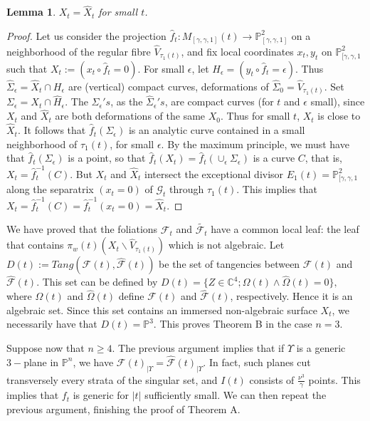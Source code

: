 \documentclass{amsart}
\newtheorem{lemma}[theorem]{Lemma}
\theoremstyle{definition}
\theoremstyle{proposition}
\numberwithin{equation}{section}
\theoremstyle{main}
\begin{document}
\begin{lemma}\label{lemafund}$X_t=\hat X_t$ for small $t$.
\end{lemma}
\begin{proof} Let us consider the projection $\hat{f}_{t}:M_{[\gamma,\gamma,1]}(t) \to  \mathbb P_{[\gamma,\gamma,1]}^2$ on a neighborhood of the regular fibre  $\hat V_{\tau_1(t)}$, and fix local coordinates $x_t,y_t$ on $\mathbb P_{[\gamma,\gamma,1}^2$ such that $X_t:=(x_t\circ\hat{f}_{t}=0)$. For small $\epsilon$, let $H_{\epsilon}=(y_t\circ\hat{f}_{t}=\epsilon)$. Thus $\hat\Sigma_\epsilon=\hat X_t\cap H_\epsilon$ are (vertical) compact curves, deformations of $\hat\Sigma_0=\hat V_{\tau_1(t)}$. Set $\Sigma_\epsilon=X_t\cap\hat H_\epsilon$. The $\Sigma_\epsilon's$, as the $\hat\Sigma_\epsilon's$, are compact curves (for $t$ and $\epsilon$ small), since $X_t$ and $\hat X_t$ are both deformations of the same $X_0$. Thus for small $t$, $X_t$ is close to $\hat X_t$. It follows that $\hat{f}_{t}(\Sigma_\epsilon)$ is an analytic curve contained in a small neighborhood of ${\tau_1(t)}$, for small $\epsilon$. By the maximum principle, we must have that $\hat{f}_{t}(\Sigma_\epsilon)$ is a point, so that  $\hat{f}_{t}(X_t)=\hat{f}_{t}(\cup_{\epsilon}\Sigma_\epsilon)$ is a curve $C$, that is, $X_t=\hat{f}_{t}^{-1}(C)$. But $X_t$ and $\hat X_t$ intersect the exceptional divisor ${{E_{1}(t)}=\mathbb P_{[\gamma,\gamma,1}^2}$ along the separatrix $(x_t=0)$ of $\mathcal G_t$ through ${\tau_1(t)}$. This implies that $X_t=\hat{f}_{t}^{-1}(C)=\hat{f}_{t}^{-1}(x_t=0)=\hat X_t$.
\end{proof}
We have proved that the foliations $\mathcal F_t$ and $\tilde{\mathcal F_t}$ have a common local leaf: the leaf that contains $\pi_{w}(t)\left(X_t\backslash\hat V_{\tau_1(t)}\right)$ which is not algebraic. Let $D(t):=Tang(\mathcal{F}(t),\hat {\mathcal{F}}(t))$ be the set of tangencies between $\mathcal{F}(t)$ and $\hat {\mathcal{F}}(t)$. This set can be defined by $D(t)=\{ Z \in \mathbb {C}^4; \Omega(t) \wedge\hat {\Omega}(t)=0\},$ where  $\Omega(t)$ and  $\hat{\Omega}(t)$ define $\mathcal{F}(t)$ and $\hat{\mathcal{F}}(t)$, respectively. Hence it is an algebraic set. Since this set contains an immersed non-algebraic surface $X_t$, we necessarily have that  $D(t)=\mathbb P^3.$ This proves Theorem B in the case $n=3.$

Suppose now that $n\geq4$. The previous argument implies that if $\Upsilon$ is a generic $3-$plane in $\mathbb P^n$, we have $\mathcal{F}(t)_{|\Upsilon}=\hat{\mathcal{F}}(t)_{|\Upsilon}$. In fact, such planes cut transversely every strata of the singular set, and $I(t)$ consists of $\frac{\nu^{3}}{ \gamma} $ points. This implies that $f_{t}$ is generic for $|t|$ sufficiently small. We can then repeat the previous argument, finishing the proof of Theorem A.
\end{document}
